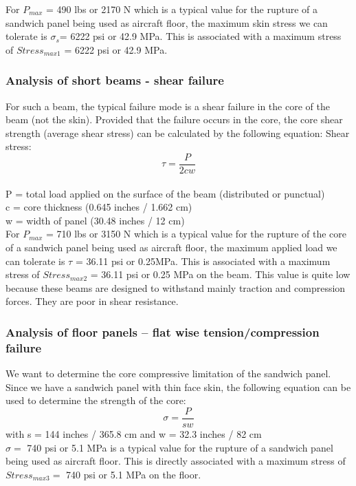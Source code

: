 For $ P_{max}$ = 490 lbs or 2170 N which is a typical value for the rupture of a sandwich panel being used as aircraft floor, the maximum skin stress we can tolerate is $ \sigma_{s}$= 6222 psi or 42.9 MPa.
This is associated with a maximum stress of $Stress_{max 1}$ = 6222 psi or 42.9 MPa.

\subsubsection{Analysis of short beams - shear failure}
For such a beam, the typical failure mode is a shear failure in the core of the beam (not the skin). Provided that the failure occurs in the core, the core shear strength (average shear stress) can be calculated by the following equation:
Shear stress: \[ \tau = \frac{P}{2 c w} \]
\\
P = total load applied on the surface of the beam (distributed or punctual)\\
c = core thickness (0.645 inches / 1.662 cm)\\
w = width of panel (30.48 inches / 12 cm)\\

For $P_{max}$ = 710 lbs or 3150 N which is a typical value for the rupture of the core of a sandwich panel being used as aircraft floor, the maximum applied load we can tolerate is $ \tau$ = 36.11 psi or 0.25MPa.
This is associated with a maximum stress of $Stress_{max 2}$ = 36.11 psi or 0.25 MPa on the beam. This value is quite low because these beams are designed to withstand mainly traction and compression forces. They are poor in shear resistance.

\subsubsection{Analysis of floor panels – flat wise tension/compression failure}
We want to determine the core compressive limitation of the sandwich panel. Since we have a sandwich panel with thin face skin, the following equation can be used to determine the strength of the core:
\[ \sigma = \frac{P}{s w} \]
with s = 144 inches / 365.8 cm and w = 32.3 inches / 82 cm \\
$ \sigma =$ 740 psi or 5.1 MPa is a typical value for the rupture of a sandwich panel being used as aircraft floor. This is directly associated with a maximum stress of $ Stress_{max 3} =$ 740 psi or 5.1 MPa on the floor.

